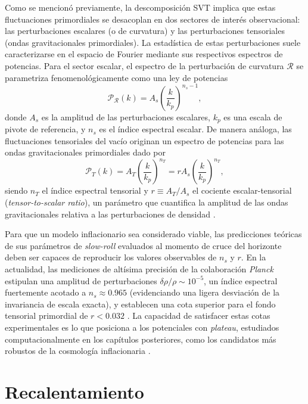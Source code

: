 Como se mencionó previamente, la descomposición SVT implica que estas fluctuaciones primordiales se desacoplan en dos sectores de interés observacional: las perturbaciones escalares (o de curvatura) y las perturbaciones tensoriales (ondas gravitacionales primordiales). La estadística de estas perturbaciones suele caracterizarse en el espacio de Fourier mediante sus respectivos espectros de potencias. Para el sector escalar, el espectro de la perturbación de curvatura $\mathcal{R}$ se parametriza fenomenológicamente como una ley de potencias
\begin{equation}
    \mathcal{P}_{\mathcal{R}}(k) = A_s \left( \frac{k}{k_p} \right)^{n_s - 1},
\end{equation}
donde $A_s$ es la amplitud de las perturbaciones escalares, $k_p$ es una escala de pivote de referencia, y $n_s$ es el índice espectral escalar. De manera análoga, las fluctuaciones tensoriales del vacío originan un espectro de potencias para las ondas gravitacionales primordiales dado por
\begin{equation}
    \mathcal{P}_{T}(k) = A_T \left( \frac{k}{k_p} \right)^{n_T} = r A_s \left( \frac{k}{k_p} \right)^{n_T},
\end{equation}
siendo $n_T$ el índice espectral tensorial y $r \equiv A_T / A_s$ el cociente escalar-tensorial (\textit{tensor-to-scalar ratio}), un parámetro que cuantifica la amplitud de las ondas gravitacionales relativa a las perturbaciones de densidad \cite{Baumann_2012}.

Para que un modelo inflacionario sea considerado viable, las predicciones teóricas de sus parámetros de \textit{slow-roll} evaluados al momento de cruce del horizonte deben ser capaces de reproducir los valores observables de $n_s$ y $r$. En la actualidad, las mediciones de altísima precisión de la colaboración \textit{Planck} estipulan una amplitud de perturbaciones $\delta\rho/\rho \sim 10^{-5}$, un índice espectral fuertemente acotado a $n_s \approx 0.965$ (evidenciando una ligera desviación de la invariancia de escala exacta), y establecen una cota superior para el fondo tensorial primordial de $r < 0.032$ \cite{Planck}. La capacidad de satisfacer estas cotas experimentales es lo que posiciona a los potenciales con \textit{plateau}, estudiados computacionalmente en los capítulos posteriores, como los candidatos más robustos de la cosmología inflacionaria \cite{Ellis_2026, Martin_2014, Martin2015}.

\section{Recalentamiento}\label{sec:reheating}

